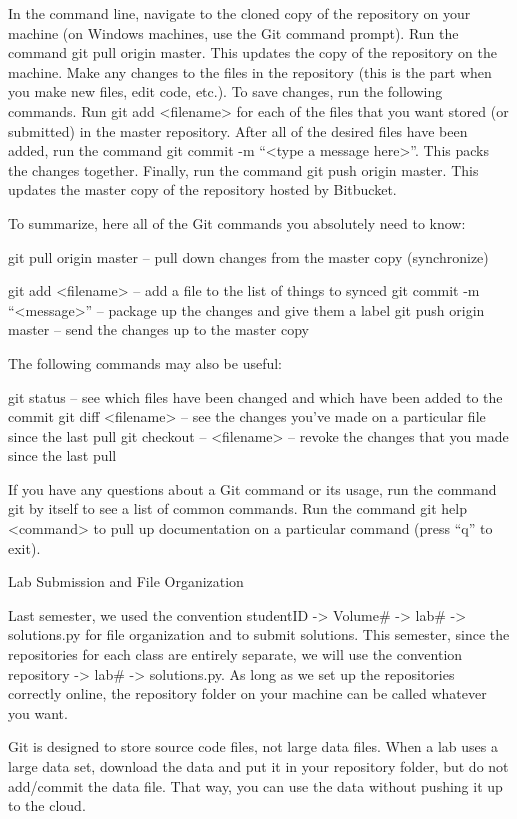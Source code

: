 In the command line, navigate to the cloned copy of the repository on your machine (on Windows machines, use the Git command prompt).
Run the command git pull origin master. This updates the copy of the repository on the machine.
Make any changes to the files in the repository (this is the part when you make new files, edit code, etc.).
To save changes, run the following commands.
Run git add <filename> for each of the files that you want stored (or submitted) in the master repository.
After all of the desired files have been added, run the command git commit -m ``<type a message here>''. This packs the changes together.
Finally, run the command git push origin master. This updates the master copy of the repository hosted by Bitbucket.

To summarize, here all of the Git commands you absolutely need to know:

git pull origin master    – pull down changes from the master copy (synchronize)

git add <filename>      – add a file to the list of things to synced
git commit -m ``<message>''   – package up the changes and give them a label
git push origin master    – send the changes up to the master copy

The following commands may also be useful:

git status        – see which files have been changed and which have been
   added to the commit
git diff <filename>       – see the changes you've made on a particular file since
   the last pull
git checkout -- <filename>    – revoke the changes that you made since the last pull

If you have any questions about a Git command or its usage, run the command git by itself to see a list of common commands. Run the command git help <command> to pull up documentation on a particular command (press ``q'' to exit).


Lab Submission and File Organization

Last semester, we used the convention studentID -> Volume\# -> lab\# -> solutions.py for file organization and to submit solutions. This semester, since the repositories for each class are entirely separate, we will use the convention repository -> lab\# -> solutions.py. As long as we set up the repositories correctly online, the repository folder on your machine can be called whatever you want.

Git is designed to store source code files, not large data files. When a lab uses a large data set, download the data and put it in your repository folder, but do not add/commit the data file. That way, you can use the data without pushing it up to the cloud.

